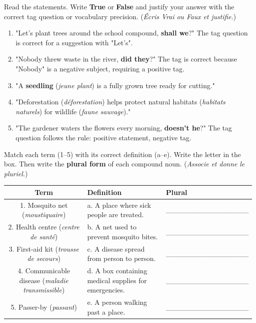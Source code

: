 \documentclass[11pt]{article}
\begin{document}
\begin{exercice}
Read the statements. Write \textbf{True} or \textbf{False} and justify your answer with the correct tag question or vocabulary precision. (\emph{Écris Vrai ou Faux et justifie.})
\begin{enumerate}
    \item "Let's plant trees around the school compound, \textbf{shall we}?" \rightarrow The tag question is correct for a suggestion with "Let's".
    \item "Nobody threw waste in the river, \textbf{did they}?" \rightarrow The tag is correct because "Nobody" is a negative subject, requiring a positive tag.
    \item "A \textbf{seedling} (\textit{jeune plant}) is a fully grown tree ready for cutting."
    \item "Deforestation (\textit{déforestation}) helps protect natural habitats (\textit{habitats naturels}) for wildlife (\textit{faune sauvage})."
    \item "The gardener waters the flowers every morning, \textbf{doesn't he}?" \rightarrow The tag question follows the rule: positive statement, negative tag.
\end{enumerate}
\end{exercice}

\begin{exercice}
Match each term (1--5) with its correct definition (a--e). Write the letter in the box. Then write the \textbf{plural form} of each compound noun. (\emph{Associe et donne le pluriel.})
\begin{center}
\begin{tabular}{|c|l|l|}
\hline
\textbf{Term} & \textbf{Definition} & \textbf{Plural} \\
\hline
1. Mosquito net (\textit{moustiquaire}) & a. A place where sick people are treated. & \_\_\_\_\_\_\_\_\_\_\_\_\_\_\_\_ \\
2. Health centre (\textit{centre de santé}) & b. A net used to prevent mosquito bites. & \_\_\_\_\_\_\_\_\_\_\_\_\_\_\_\_ \\
3. First-aid kit (\textit{trousse de secours}) & c. A disease spread from person to person. & \_\_\_\_\_\_\_\_\_\_\_\_\_\_\_\_ \\
4. Communicable disease (\textit{maladie transmissible}) & d. A box containing medical supplies for emergencies. & \_\_\_\_\_\_\_\_\_\_\_\_\_\_\_\_ \\
5. Passer-by (\textit{passant}) & e. A person walking past a place. & \_\_\_\_\_\_\_\_\_\_\_\_\_\_\_\_ \\
\hline
\end{tabular}
\end{center}
\end{exercice}
\end{document}
